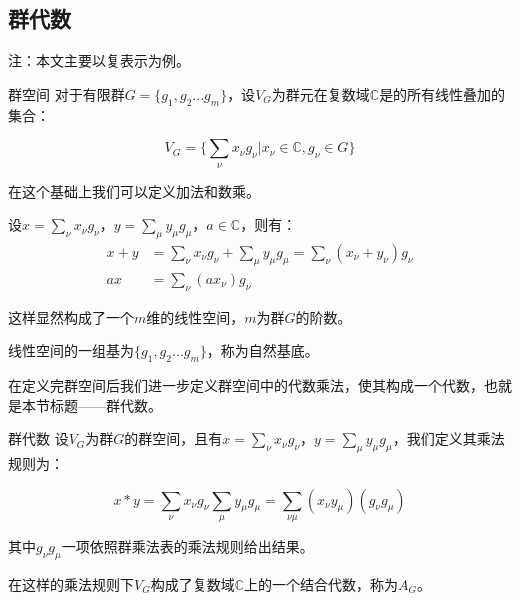 

\subsection{群代数}

注：本文主要以复表示为例。

\begin{definition}{群空间}
对于有限群$G=\{g_1,g_2...g_m\}$，设$V_G$为群元在复数域$\mathbb{C}$是的所有线性叠加的集合：

\begin{equation}
V_G=\{\displaystyle\sum_\nu x_\nu g_\nu|x_\nu \in \mathbb{C},g_\nu \in G\}
\end{equation}

在这个基础上我们可以定义加法和数乘。

设$x=\displaystyle\sum_\nu x_\nu g_\nu$，$y=\displaystyle\sum_\mu y_\mu g_\mu$，$a\in \mathbb{C}$，则有：
\begin{align}
x+y&=\displaystyle\sum_\nu x_\nu g_\nu+\displaystyle\sum_\mu y_\mu g_\mu=\displaystyle\sum_\nu(x_\nu+y_\nu)g_\nu\\
ax&=\displaystyle\sum_\nu (ax_\nu) g_\nu
\end{align}

这样显然构成了一个$m$维的线性空间，$m$为群$G$的阶数。

线性空间的一组基为$\{g_1,g_2...g_m\}$，称为自然基底。

\end{definition}

在定义完群空间后我们进一步定义群空间中的代数乘法，使其构成一个代数，也就是本节标题——群代数。

\begin{definition}{群代数}
设$V_G$为群$G$的群空间，且有$x=\displaystyle\sum_\nu x_\nu g_\nu$，$y=\displaystyle\sum_\mu y_\mu g_\mu$，我们定义其乘法规则为：

\begin{equation}
x * y = \displaystyle\sum_{\nu} x_\nu g_\nu \sum_{\mu} y_\mu g_\mu =
\displaystyle\sum_{\nu\mu}(x_\nu y_\mu) (g_\nu g_\mu)
\end{equation}

其中$g_\nu g_\mu$一项依照群乘法表的乘法规则给出结果。

在这样的乘法规则下$V_G$构成了复数域$\mathbb{C}$上的一个结合代数，称为$A_G$。

\end{definition}

